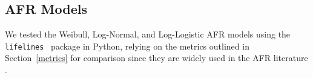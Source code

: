 \subsection{AFR Models}
We tested the Weibull, Log-Normal, and Log-Logistic AFR models using the \texttt{lifelines}~\citep{lifelines} package in Python, relying on the metrics outlined in Section~\ref{metrics} for comparison since they are widely used in the AFR literature \citep{aft_models}.
